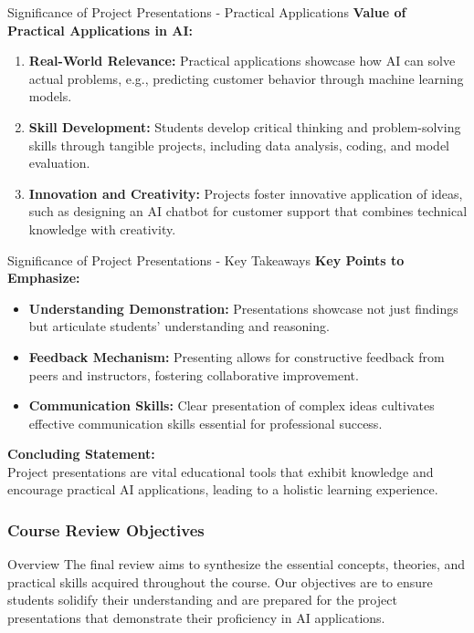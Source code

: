 \documentclass[aspectratio=169]{beamer}
\begin{document}
\begin{frame}[fragile]{Significance of Project Presentations - Practical Applications}
    \textbf{Value of Practical Applications in AI:}
    \begin{enumerate}
        \item \textbf{Real-World Relevance:} 
        Practical applications showcase how AI can solve actual problems, e.g., predicting customer behavior through machine learning models.
        
        \item \textbf{Skill Development:} 
        Students develop critical thinking and problem-solving skills through tangible projects, including data analysis, coding, and model evaluation.
        
        \item \textbf{Innovation and Creativity:} 
        Projects foster innovative application of ideas, such as designing an AI chatbot for customer support that combines technical knowledge with creativity.
    \end{enumerate}
\end{frame}

\begin{frame}[fragile]{Significance of Project Presentations - Key Takeaways}
    \textbf{Key Points to Emphasize:}
    \begin{itemize}
        \item \textbf{Understanding Demonstration:} 
        Presentations showcase not just findings but articulate students' understanding and reasoning.
        
        \item \textbf{Feedback Mechanism:} 
        Presenting allows for constructive feedback from peers and instructors, fostering collaborative improvement.
        
        \item \textbf{Communication Skills:} 
        Clear presentation of complex ideas cultivates effective communication skills essential for professional success.
    \end{itemize}

    \textbf{Concluding Statement:} \\
    Project presentations are vital educational tools that exhibit knowledge and encourage practical AI applications, leading to a holistic learning experience.
\end{frame}

\begin{frame}
    \frametitle{Course Review Objectives}
    \begin{block}{Overview}
        The final review aims to synthesize the essential concepts, theories, and practical skills acquired throughout the course. 
        Our objectives are to ensure students solidify their understanding and are prepared for the project presentations that demonstrate their proficiency in AI applications.
    \end{block}
\end{frame}
\end{document}
